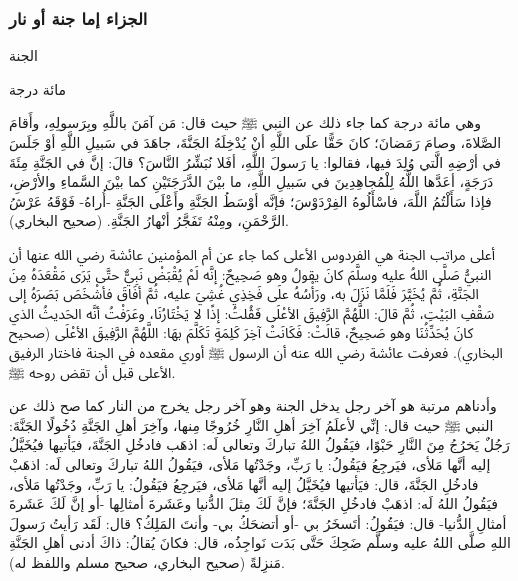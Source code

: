 \subsubsection{الجزاء إما جنة أو نار}

الجنة 

مائة درجة 

وهي مائة درجة كما جاء ذلك عن النبي ﷺ حيث قال: مَن آمَنَ باللَّهِ وبِرَسولِهِ، وأَقامَ الصَّلاةَ، وصامَ رَمَضانَ؛ كانَ حَقًّا علَى اللَّهِ أنْ يُدْخِلَهُ الجَنَّةَ، جاهَدَ في سَبيلِ اللَّهِ أوْ جَلَسَ في أرْضِهِ الَّتي وُلِدَ فيها، فقالوا: يا رَسولَ اللَّهِ، أفَلا نُبَشِّرُ النَّاسَ؟ قالَ: إنَّ في الجَنَّةِ مِئَةَ دَرَجَةٍ، أعَدَّها اللَّهُ لِلْمُجاهِدِينَ في سَبيلِ اللَّهِ، ما بيْنَ الدَّرَجَتَيْنِ كما بيْنَ السَّماءِ والأرْضِ، فإذا سَأَلْتُمُ اللَّهَ، فاسْأَلُوهُ الفِرْدَوْسَ؛ فإنَّه أوْسَطُ الجَنَّةِ وأَعْلَى الجَنَّةِ -أُراهُ- فَوْقَهُ عَرْشُ الرَّحْمَنِ، ومِنْهُ تَفَجَّرُ أنْهارُ الجَنَّةِ. {\footnotesize (صحيح البخاري)}.

أعلى مراتب الجنة هي الفردوس الأعلى كما جاء عن أم المؤمنين عائشة رضي الله عنها أن النبيُّ صَلَّى اللهُ عليه وسلَّمَ كانَ يقولُ وهو صَحِيحٌ: إنَّه لَمْ يُقْبَضْ نَبِيٌّ حتَّى يَرَى مَقْعَدَهُ مِنَ الجَنَّةِ، ثُمَّ يُخَيَّرَ فَلَمَّا نَزَلَ به، ورَأْسُهُ علَى فَخِذِي غُشِيَ عليه، ثُمَّ أفَاقَ فأشْخَصَ بَصَرَهُ إلى سَقْفِ البَيْتِ، ثُمَّ قالَ: اللَّهُمَّ الرَّفِيقَ الأعْلَى \.فَقُلتُ: إذًا لا يَخْتَارُنَا، وعَرَفْتُ أنَّه الحَديثُ الذي كانَ يُحَدِّثُنَا وهو صَحِيحٌ، قالَتْ: فَكَانَتْ آخِرَ كَلِمَةٍ تَكَلَّمَ بهَا: اللَّهُمَّ الرَّفِيقَ الأعْلَى {\footnotesize (صحيح البخاري)}. فعرفت عائشة رضي الله عنه أن الرسول ﷺ أوري مقعده في الجنة فاختار الرفيق الأعلى  قبل أن تقض روحه ﷺ.


وأدناهم مرتبة هو آخر رجل يدخل الجنة وهو آخر رجل يخرج من النار كما صح ذلك عن النبي ﷺ حيث قال: إنِّي لأعلَمُ آخِرَ أهلِ النَّارِ خُرُوجًا مِنها، وآخِرَ أهلِ الجَنَّةِ دُخُولًا الجَنَّةَ: رَجُلٌ يَخرُجُ مِنَ النَّارِ حَبْوًا، فيَقُولُ اللهُ تباركَ وتعالى لَه: اذهَب فادخُلِ الجَنَّةَ، فيَأتيها فيُخَيَّلُ إليه أنَّها مَلأى، فيَرجِعُ فيَقُولُ: يا رَبِّ، وجَدْتُها مَلأى، فيَقُولُ اللهُ تباركَ وتعالى لَه: اذهَبْ فادخُلِ الجَنَّةَ، قال: فيَأتيها فيُخَيَّلُ إليه أنَّها مَلأى، فيَرجِعُ فيَقُولُ: يا رَبِّ، وجَدْتُها مَلأى، فيَقُولُ اللهُ لَه: اذهَبْ فادخُلِ الجَنَّةَ؛ فإنَّ لَكَ مِثلَ الدُّنيا وعَشَرةَ أمثالِها -أو إنَّ لَكَ عَشَرةَ أمثالِ الدُّنيا- قال: فيَقُولُ: أتَسخَرُ بي -أو أتضحَكُ بي- وأنتَ المَلِكُ؟ قال: لَقَد رَأيتُ رَسولَ اللهِ صلَّى اللهُ عليه وسلَّم ضَحِكَ حَتَّى بَدَت نَواجِذُه، قال: فكانَ يُقالُ: ذاكَ أدنى أهلِ الجَنَّةِ مَنزِلةً {\footnotesize (صحيح البخاري، صحيح مسلم واللفظ له)}.





